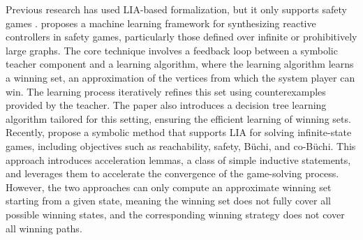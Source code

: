 \documentclass[review]{elsarticle}
\begin{document}
Previous research has used LIA-based formalization, but it only supports safety games \citep{DanO2019}.
\citet{DanO2019} proposes a machine learning framework for synthesizing reactive controllers in safety games, particularly those defined over infinite or prohibitively large graphs. The core technique involves a feedback loop between a symbolic teacher component and a learning algorithm, where the learning algorithm learns a winning set, an approximation of the vertices from which the system player can win. The learning process iteratively refines this set using counterexamples provided by the teacher.
The paper also introduces a decision tree learning algorithm tailored for this setting, ensuring the efficient learning of winning sets. 
Recently, \citet{HeiR2024} propose a symbolic method that supports LIA for solving infinite-state games, including objectives such as reachability, safety, Büchi, and co-Büchi. This approach introduces acceleration lemmas, a class of simple inductive statements, and leverages them to accelerate the convergence of the game-solving process. 
However, the two approaches can only compute an approximate winning set starting from a given state, meaning the winning set does not fully cover all possible winning states, and the corresponding winning strategy does not cover all winning paths.
\end{document}
